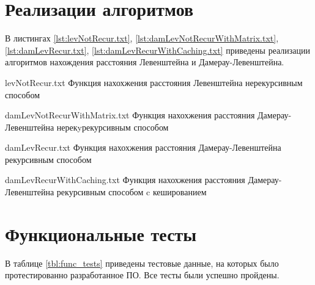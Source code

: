 \section{Реализации алгоритмов}


В листингах \ref{lst:levNotRecur.txt}, \ref{lst:damLevNotRecurWithMatrix.txt}, \ref{lst:damLevRecur.txt}, \ref{lst:damLevRecurWithCaching.txt} приведены реализации алгоритмов нахождения расстояния Левенштейна и Дамерау-Левенштейна.

{levNotRecur.txt} %
{Функция нахохжения расстояния Левенштейна нерекурсивным способом} %

\clearpage

{damLevNotRecurWithMatrix.txt} %
{Функция нахохжения расстояния Дамерау-Левенштейна нерекyрекурсивным способом} %

\clearpage

{damLevRecur.txt} %
{Функция нахохжения расстояния Дамерау-Левенштейна рекурсивным способом} %

\clearpage

{damLevRecurWithCaching.txt} %
{Функция нахохжения расстояния Дамерау-Левенштейна рекурсивным способом c кешированием} %

\clearpage

\section{Функциональные тесты}

В таблице \ref{tbl:func_tests} приведены тестовые данные, на которых было протестированно разработанное ПО. Все тесты были успешно пройдены.


